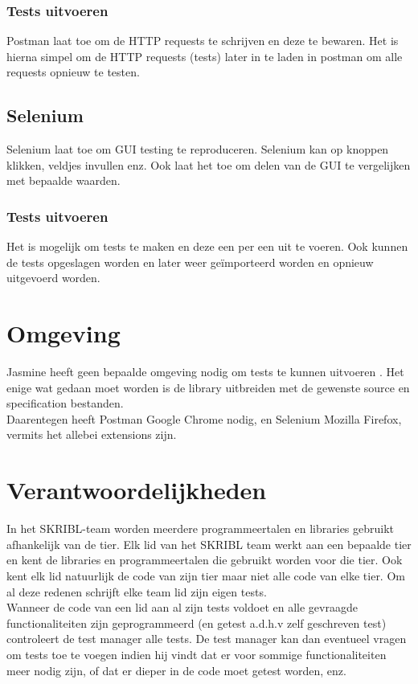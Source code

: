 \documentclass{article}
\begin{document}
\subsubsection{Tests uitvoeren}
Postman laat toe om de HTTP requests te schrijven en deze te bewaren. Het is hierna simpel om de HTTP requests (tests) later in te laden in postman om alle requests opnieuw te testen.
%
\subsection{Selenium}
Selenium laat toe om GUI testing te reproduceren. Selenium kan op knoppen klikken, veldjes invullen enz. Ook laat het toe om delen van de GUI te vergelijken met bepaalde waarden. 
%
\subsubsection{Tests uitvoeren}
Het is mogelijk om tests te maken en deze een per een uit te voeren. Ook kunnen de tests opgeslagen worden en later weer ge\"importeerd worden en opnieuw uitgevoerd worden. 
%
\section{Omgeving}
Jasmine heeft geen bepaalde omgeving nodig om tests te kunnen uitvoeren . Het enige wat gedaan moet worden is de library uitbreiden met de gewenste source en specification bestanden.
\\
Daarentegen heeft Postman Google Chrome nodig, en Selenium Mozilla Firefox, vermits het allebei extensions zijn.
%
\section{Verantwoordelijkheden}
In het SKRIBL-team worden meerdere programmeertalen en libraries gebruikt afhankelijk van de tier. Elk lid van het SKRIBL team werkt aan een bepaalde tier en kent de libraries en programmeertalen die gebruikt worden voor die tier. Ook kent elk lid natuurlijk de code van zijn tier maar niet alle code van elke tier. Om al deze redenen schrijft elke team lid zijn eigen tests.\\
Wanneer de code van een lid aan al zijn tests voldoet en alle gevraagde functionaliteiten zijn geprogrammeerd (en getest a.d.h.v zelf geschreven test) controleert de test manager alle tests. De test manager kan dan eventueel vragen om tests toe te voegen indien hij vindt dat er voor sommige functionaliteiten meer nodig zijn, of dat er dieper in de code moet getest worden, enz.
%
\end{document}
